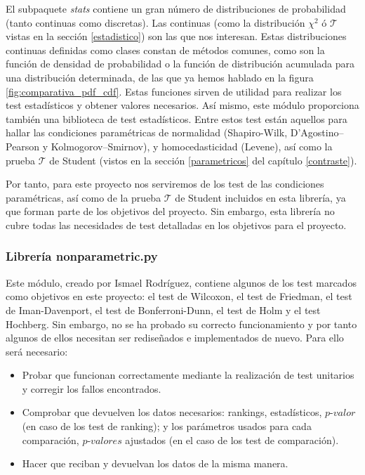 El subpaquete \textit{stats} contiene un gran número de distribuciones de probabilidad (tanto continuas como discretas). Las continuas (como la distribución $\chi^2$ ó $\mathcal{T}$ vistas en la sección \ref{estadistico}) son las que nos interesan. Estas distribuciones continuas definidas como clases constan de métodos comunes, como son la función de densidad de probabilidad o la función de distribución acumulada para una distribución determinada, de las que ya hemos hablado en la figura \ref{fig:comparativa_pdf_cdf}. Estas funciones sirven de utilidad para realizar los test estadísticos y obtener valores necesarios. Así mismo, este módulo proporciona también una biblioteca de test estadísticos. Entre estos test están aquellos para hallar las condiciones paramétricas de normalidad (Shapiro-Wilk, D’Agostino–Pearson y Kolmogorov–Smirnov), y homocedasticidad (Levene), así como la prueba $\mathcal{T}$ de Student (vistos en la sección \ref{parametricos} del capítulo \ref{contraste}). 

Por tanto, para este proyecto nos serviremos de los test de las condiciones paramétricas, así como de la prueba $\mathcal{T}$ de Student incluidos en esta librería, ya que forman parte de los objetivos del proyecto. Sin embargo, esta librería no cubre todas las necesidades de test detalladas en los objetivos para el proyecto.
 
\subsubsection{\textbf{Librería nonparametric.py}} \label{nonparametric}
Este módulo, creado por Ismael Rodríguez, contiene algunos de los test marcados como objetivos en este proyecto: el test de Wilcoxon, el test de Friedman, el test de Iman-Davenport, el test de Bonferroni-Dunn, el test de Holm y el test Hochberg. Sin embargo, no se ha probado su correcto funcionamiento y por tanto algunos de ellos necesitan ser rediseñados e implementados de nuevo. Para ello será necesario:

\begin{itemize}
\item Probar que funcionan correctamente mediante la realización de test unitarios y corregir los fallos encontrados.
\item Comprobar que devuelven los datos necesarios: rankings, estadísticos, $\textit{p-valor}$ (en caso de los test de ranking); y los parámetros usados para cada comparación, $\textit{p-valor}es$ ajustados (en el caso de los test de comparación).
\item Hacer que reciban y devuelvan los datos de la misma manera. 
\end{itemize}


